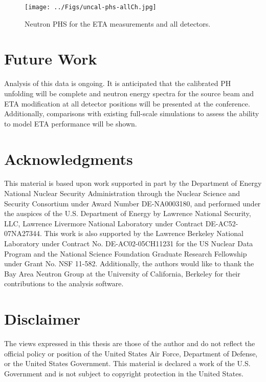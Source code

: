 \documentclass[twocolumn,10pt,final]{asme2ej}
\begin{document}
\vspace{-0.5 cm}
\begin{figure} [htp!]
 \centering
 \texttt{[image: ../Figs/uncal-phs-allCh.jpg]}
   \caption{Neutron PHS for the ETA measurements and all detectors.}
  \label{PHS}
\vspace{-0.4 cm}
\end{figure}

\vspace{-0.4 cm}
\section{Future Work} \label{sec:future-work}

Analysis of this data is ongoing.
It is anticipated that the calibrated PH unfolding will be complete and neutron energy spectra for the source beam and ETA modification at all detector positions will be presented at the conference.
Additionally, comparisons with existing full-scale simulations to assess the ability to model ETA performance will be shown. 


\vspace{-0.4 cm}
\section*{Acknowledgments}
This material is based upon work supported in part by the Department of Energy National Nuclear Security Administration through the Nuclear Science and Security Consortium under Award Number DE-NA0003180, and performed under the auspices of the U.S. Department of Energy by Lawrence National Security, LLC, Lawrence Livermore National Laboratory under Contract DE-AC52-07NA27344. 
This work is also supported by the Lawrence Berkeley National Laboratory under Contract No. DE-AC02-05CH11231 for the US Nuclear Data Program and the National Science Foundation Graduate Research Fellowship under Grant No. NSF 11-582.
Additionally, the authors would like to thank the Bay Area Neutron Group at the University of California, Berkeley for their contributions to the analysis software.

\vspace{-0.3 cm}
\section*{Disclaimer}
The views expressed in this thesis are those of the author and do not reflect the official policy or position of the United States Air Force, Department of Defense, or the United States Government.  This material is declared a work of the U.S. Government and is not subject to copyright protection in the United States.
\end{document}
